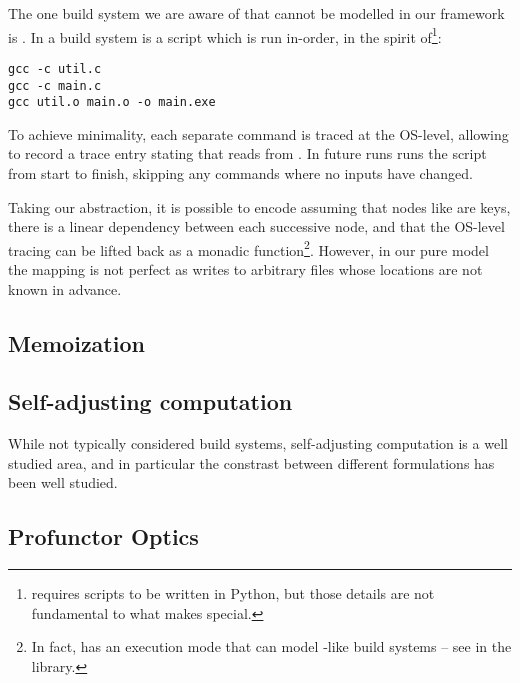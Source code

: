The one build system we are aware of that cannot be modelled in our framework is \Fabricate \cite{fabricate}. In \Fabricate a build system is a script which is run in-order, in the spirit of\footnote{\Fabricate requires scripts to be written in Python, but those details are not fundamental to what makes \Fabricate special.}:

\begin{verbatim}
gcc -c util.c
gcc -c main.c
gcc util.o main.o -o main.exe
\end{verbatim}

To achieve minimality, each separate command is traced at the OS-level, allowing \Fabricate to record a trace entry stating that  reads from . In future runs \Fabricate runs the script from start to finish, skipping any commands where no inputs have changed.

Taking our abstraction, it is possible to encode \Fabricate assuming that nodes like  are keys, there is a linear dependency between each successive node, and that the OS-level tracing can be lifted back as a monadic  function\footnote{In fact, \Shake has an execution mode that can model \Fabricate{}-like build systems -- see  in the \Shake library.}. However, in our pure model the mapping is not perfect as  writes to arbitrary files whose locations are not known in advance.

\subsection{Memoization}\label{sec-related-memo}


\subsection{Self-adjusting computation}

While not typically considered build systems, self-adjusting computation is a well studied area, and in particular the constrast between different formulations has been well studied. 

\subsection{Profunctor Optics}\label{sec-related-optics}


